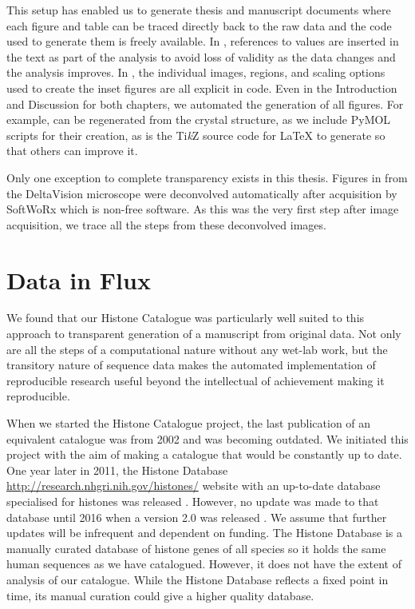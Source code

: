 This setup has enabled us to generate thesis and manuscript documents where each
figure and table can be traced directly back to the raw
data and the code used to generate them is freely
available.
In
, references to values are inserted in the
text as part of the analysis to avoid loss of validity as the data
changes and the analysis improves.  In , the
individual images, regions, and scaling options used to create the
inset figures are all explicit in code.  Even in the Introduction and
Discussion for both chapters, we
automated the generation of all figures.  For example,
 can be regenerated from the
crystal structure, as we include PyMOL
scripts for their creation, as is
the Ti\textit{k}Z source code
for \LaTeX{} to generate  so that
others can improve it.

Only one exception to complete transparency
exists in this thesis.  Figures in
 from the DeltaVision microscope were deconvolved
automatically after
acquisition by SoftWoRx which is non-free software.
As this was the very first step
after image acquisition, we trace all the steps from these
deconvolved images.


\section{Data in Flux}

We found that our Histone Catalogue 
was particularly well suited
to this approach to transparent generation of a manuscript from
original data.  Not only are all the steps of a computational
nature without any wet-lab work, but the transitory nature of sequence data
makes the automated implementation of reproducible research useful
beyond the intellectual of achievement making it reproducible.

When we started the Histone Catalogue project, the last publication of
an equivalent catalogue
was from 2002 and was becoming outdated.  We initiated
this project with the aim of making a catalogue that would be
constantly up to date.  One year later in 2011, the Histone Database
\url{http://research.nhgri.nih.gov/histones/}
website with an up-to-date database specialised for histones
was released \citep{histonedb-2011}.
However, no update was made to that database until 2016 when a version 2.0
was released \citep{HistoneDB2016}.
We assume that further updates will
be infrequent and dependent on funding.
The Histone Database is a manually curated database of histone
genes of all species so it holds the same human sequences as we have
catalogued.
However, it does not have the extent of analysis of our catalogue.
While the Histone Database reflects a fixed point in time,
its manual curation could give a higher quality database.

